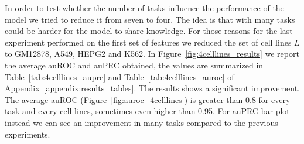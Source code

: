 
In order to test whether the number of tasks influence the performance of the model we tried to reduce it from seven to four. The idea is that with many tasks could be harder for the model to share knowledge. For those reasons for the last experiment performed on the first set of features we reduced the set of cell lines $L$ to GM12878, A549, HEPG2 and K562. In Figure~\ref{fig:4celllines_results} we report the average auROC and auPRC obtained, the values are summarized in Table~\ref{tab:4celllines_auprc} and Table~\ref{tab:4celllines_auroc} of Appendix~\ref{appendix:results_tables}. The results shows a significant improvement. The average auROC (Figure~\ref{fig:auroc_4celllines}) is greater than 0.8 for every task and every cell lines, sometimes even higher than 0.95. For auPRC bar plot instead we can see an improvement in many tasks compared to the previous experiments.
